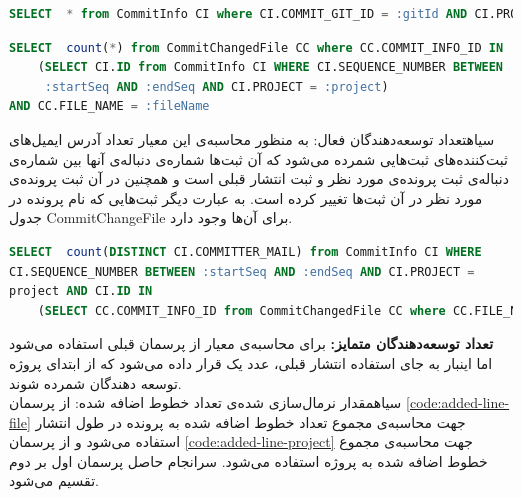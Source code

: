 \begin{latin}
	\begin{lstlisting}[language=SQL]
SELECT  * from CommitInfo CI where CI.COMMIT_GIT_ID = :gitId AND CI.PROJECT = :project
\end{lstlisting}
\end{latin}
\label{code:commit-info}

\begin{latin}
\begin{lstlisting}[language=SQL]
SELECT  count(*) from CommitChangedFile CC where CC.COMMIT_INFO_ID IN
	(SELECT CI.ID from CommitInfo CI WHERE CI.SEQUENCE_NUMBER BETWEEN 
	 :startSeq AND :endSeq AND CI.PROJECT = :project)
AND CC.FILE_NAME = :fileName
\end{lstlisting}
\end{latin}
\label{code:comm}

‌سیاه{‫تعداد توسعه‌دهندگان فعال:‬}
به منظور محاسبه‌ی این معیار تعداد آدرس ایمیل‌های ثبت‌کننده‌های ثبت‌هایی شمرده می‌شود که آن ثبت‌ها شماره‌ی دنباله‌ی آنها بین شماره‌ی دنباله‌ی ثبت پرونده‌ی مورد نظر و ثبت انتشار قبلی است و همچنین در آن ثبت پرونده‌ی مورد نظر در آن ثبت‌ها تغییر کرده است. به عبارت دیگر ثبت‌هایی که نام پرونده در جدول  CommitChangeFile  برای آن‌ها وجود دارد. 

\begin{latin}
\begin{lstlisting}[language=SQL]
SELECT  count(DISTINCT CI.COMMITTER_MAIL) from CommitInfo CI WHERE
CI.SEQUENCE_NUMBER BETWEEN :startSeq AND :endSeq AND CI.PROJECT = 
project AND CI.ID IN 
	(SELECT CC.COMMIT_INFO_ID from CommitChangedFile CC where CC.FILE_NAME = :fileName)
\end{lstlisting}
\end{latin}

\textbf{تعداد توسعه‌دهندگان متمایز:}
برای محاسبه‌ی معیار از پرسمان قبلی استفاده می‌شود اما اینبار به جای استفاده  انتشار قبلی، عدد یک  قرار داده می‌شود که از ابتدای پروژه توسعه دهندگان شمرده شوند. 
\\

‌سیاه{‫مقدار نرمال‌سازی شده‌ی تعداد خطوط اضافه شده:‬}
از پرسمان \ref{code:added-line-file} جهت محاسبه‌ی مجموع تعداد خطوط اضافه شده به پرونده در طول انتشار استفاده می‌شود و از پرسمان \ref{code:added-line-project} جهت محاسبه‌ی مجموع خطوط اضافه شده به پروژه استفاده می‌شود. سرانجام حاصل پرسمان اول بر دوم تقسیم می‌شود. 

